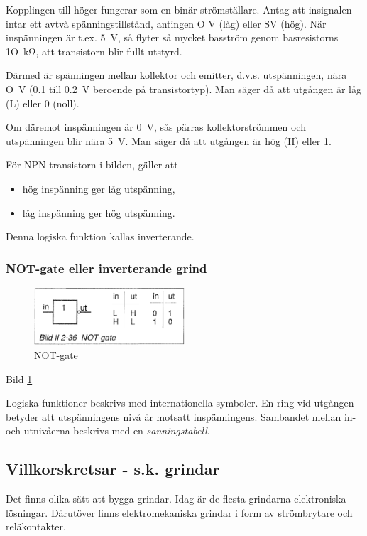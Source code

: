 Kopplingen till höger fungerar som en binär strömställare. Antag att insignalen
intar ett avtvå spänningstillstånd, antingen O V (låg) eller SV (hög). När
inspänningen är t.ex. 5~V, så flyter så mycket basström genom basresistorns
1O~kΩ, att transistorn blir fullt utstyrd.

Därmed är spänningen mellan kollektor och emitter, d.v.s. utspänningen, nära O~V
(0.1 till 0.2~V beroende på transistortyp). Man säger då att utgången är låg (L)
eller 0 (noll).

Om däremot inspänningen är 0~V, sås pärras kollektorströmmen och utspänningen
blir nära 5~V. Man säger då att utgången är hög (H) eller 1.

För NPN-transistorn i bilden, gäller att
\begin{itemize}
\item hög inspänning ger låg utspänning,
\item låg inspänning ger hög utspänning.
\end{itemize}
Denna logiska funktion kallas inverterande.

\subsubsection{NOT-gate eller inverterande grind}

\begin{figure}
\includegraphics[width=0.5\textwidth]{images/bild_2_2-36}
\caption{NOT-gate}
\label{fig:BildII2-36}
\end{figure}

Bild \ref{fig:BildII2-36}

Logiska funktioner beskrivs med internationella symboler. En ring vid utgången
betyder att utspänningens nivå är motsatt inspänningens. Sambandet mellan in-
och utnivåerna beskrivs med en \emph{sanningstabell}.

\subsection{Villkorskretsar - s.k. grindar}

Det finns olika sätt att bygga grindar. Idag är de flesta grindarna elektroniska
lösningar. Därutöver finns elektromekaniska grindar i form av strömbrytare och
reläkontakter.

